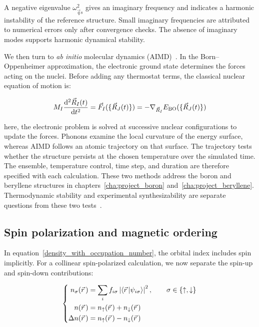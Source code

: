 A negative eigenvalue $\omega_{\vec{q}s}^{2}$ gives an imaginary frequency and indicates a harmonic instability of the reference structure.
Small imaginary frequencies are attributed to numerical errors only after convergence checks.
The absence of imaginary modes supports harmonic dynamical stability.

We then turn to \textit{ab initio} molecular dynamics (AIMD)~\cite{marx2009ab}.
In the Born--Oppenheimer approximation,
the electronic ground state determines the forces acting on the nuclei.
Before adding any thermostat terms, the classical nuclear equation of motion is:

\begin{equation}
    M_I\frac{\mathrm{d}^2\vec{R}_I(t)}{\mathrm{d} t^2}
    =
    \vec{F}_I(\{\vec{R}_J(t)\})
    =
    -\nabla_{\vec{R}_I}E_\mathrm{BO}(\{\vec{R}_J(t)\})
\label{born_oppenheimer_nuclear_motion}
\end{equation}

here, the electronic problem is solved at successive nuclear configurations to update the forces.
Phonons examine the local curvature of the energy surface,
whereas AIMD follows an atomic trajectory on that surface.
The trajectory tests whether the structure persists at the chosen temperature over the simulated time.
The ensemble, temperature control, time step, and duration are therefore specified with each calculation.
These two methods address the boron and beryllene structures in chapters~\ref{cha:project_boron} and~\ref{cha:project_beryllene}.
Thermodynamic stability and experimental synthesizability are separate questions from these two tests~\cite{stampfl2005surface}.

\subsection{Spin polarization and magnetic ordering}
\label{subsec:method_magnetism}

In equation~\eqref{density_with_occupation_number}, the orbital index includes spin implicitly.
For a collinear spin-polarized calculation,
we now separate the spin-up and spin-down contributions:

\begin{equation}
\left\{\begin{aligned}
    n_\sigma(\vec{r}\,)
    &=\sum_i f_{i\sigma}\left|\braket{\vec{r}\,|\psi_{i\sigma}}\right|^2,
    \qquad \sigma\in\{\uparrow,\downarrow\} \\
    n(\vec{r}\,)&=n_\uparrow(\vec{r}\,)+n_\downarrow(\vec{r}\,) \\
    \Delta n(\vec{r}\,)&=n_\uparrow(\vec{r}\,)-n_\downarrow(\vec{r}\,)
\end{aligned}\right.
\label{spin_resolved_density_method}
\end{equation}

